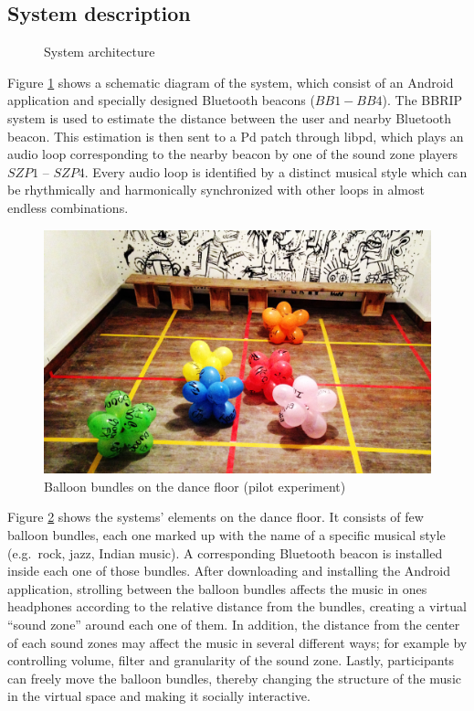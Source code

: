 \documentclass[a4paper,11pt]{article}
\begin{document}
\subsection{System description}\label{systemdescription}

\begin{figure}[!htb]
	\centering
	\def\svgwidth{0.9\textwidth}
	
	\caption{System architecture}\label{fig:sys:architecture}
\end{figure}

Figure \ref{fig:sys:architecture} shows a schematic diagram of the system, which consist of an Android application and specially designed Bluetooth beacons ($BB1 - BB4$).
The BBRIP system is used to estimate the distance between the user and nearby Bluetooth beacon.
This estimation is then sent to a Pd patch through libpd, which plays an audio loop corresponding to the nearby beacon by one of the sound zone players $SZP1$ -- $SZP4$.
Every audio loop is identified by a distinct musical style which can be rhythmically and harmonically synchronized with other loops in almost endless combinations.

\begin{figure}[!htb]
	\includegraphics[width=\linewidth]{balloons}
	\caption{Balloon bundles on the dance floor (pilot experiment)}\label{fig:balloons}
\end{figure}

Figure \ref{fig:balloons} shows the systems' elements on the dance floor.
It consists of few balloon bundles, each one marked up with the name of a specific musical style (e.g.\ rock, jazz, Indian music).
A corresponding Bluetooth beacon is installed inside each one of those bundles.
After downloading and installing the Android application, strolling between the balloon bundles affects the music in ones headphones according to the relative distance from the bundles, creating a virtual ``sound zone'' around each one of them.
In addition, the distance from the center of each sound zones may affect the music in several different ways; for example by controlling volume, filter and granularity of the sound zone.
Lastly, participants can freely move the balloon bundles, thereby changing the structure of the music in the virtual space and making it socially interactive.
\end{document}
